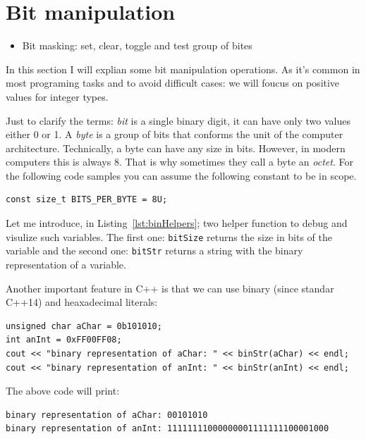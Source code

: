 \section{Bit manipulation}
\begin{itemize}
  \item Bit masking: set, clear, toggle and test group of bites
\end{itemize}
In this section I will explian some bit manipulation operations. As it's common in most programing tasks and to avoid difficult cases: we will foucus on positive values for integer types.

Just to clarify the terms: \emph{bit} is a single binary digit, it can have only two values either 0 or 1. A \emph{byte} is a group of bits that conforms the unit of the computer architecture. Technically, a byte can have any size in bits. However, in modern computers this is always 8. That is why sometimes they call a byte an \emph{octet}. For the following code samples you can assume the following constant to be in scope.

\begin{verbatim}
const size_t BITS_PER_BYTE = 8U;
\end{verbatim}

Let me introduce, in Listing~\ref{lst:binHelpers}; two helper function to debug and visulize such variables. The first one: \texttt{bitSize} returns the size in bits of the variable and the second one: \texttt{bitStr} returns a string with the binary representation of a variable.

{\centering
\begin{minipage}{\linewidth}
\end{minipage}
\par
}

Another important feature in C++ is that we can use binary (since standar C++14) and heaxadecimal literals:
\begin{verbatim}
unsigned char aChar = 0b101010;
int anInt = 0xFF00FF08;
cout << "binary representation of aChar: " << binStr(aChar) << endl;
cout << "binary representation of anInt: " << binStr(anInt) << endl;
\end{verbatim}
The above code will print:
\begin{verbatim}
binary representation of aChar: 00101010
binary representation of anInt: 11111111000000001111111100001000
\end{verbatim} 

